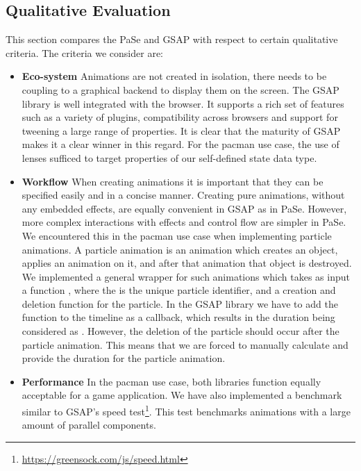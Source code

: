 \subsection{Qualitative Evaluation}

This section compares the PaSe and GSAP with respect to certain qualitative criteria. The criteria we consider are:

\begin{itemize}
\item \textbf{Eco-system} Animations are not created in isolation, there needs to be coupling to a graphical backend to display them on the screen. The GSAP library is well integrated with the browser. It supports a rich set of features such as a variety of plugins, compatibility across browsers and support for tweening a large range of properties. It is clear that the maturity of GSAP makes it a clear winner in this regard. For the pacman use case, the use of lenses sufficed to target properties of our self-defined state data type.
\item \textbf{Workflow} When creating animations it is important that they can be specified easily and in a concise manner. Creating pure animations, without any embedded effects, are equally convenient in GSAP as in PaSe. However, more complex interactions with effects and control flow are simpler in PaSe. We encountered this in the pacman use case when implementing particle animations. A particle animation is an animation which creates an object, applies an animation on it, and after that animation that object is destroyed. We implemented a general wrapper for such animations which takes as input a function , where the  is the unique particle identifier, and a creation and deletion function for the particle. In the GSAP library we have to add the function to the timeline as a callback, which results in the duration being considered as . However, the deletion of the particle should occur after the particle animation. This means that we are forced to manually calculate and provide the duration for the particle animation.
\item \textbf{Performance} In the pacman use case, both libraries function equally acceptable for a game application. We have also implemented a benchmark similar to GSAP's speed test\footnote{\url{https://greensock.com/js/speed.html}}. This test benchmarks animations with a large amount of parallel components.

\end{itemize}
